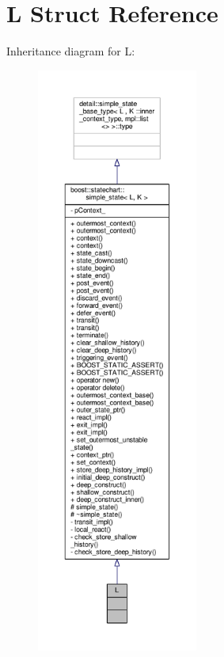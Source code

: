\hypertarget{struct_l}{}\section{L Struct Reference}
\label{struct_l}


Inheritance diagram for L\+:
\nopagebreak
\begin{figure}[H]
\begin{center}
\leavevmode
\includegraphics[height=550pt]{struct_l__inherit__graph}
\end{center}
\end{figure}


